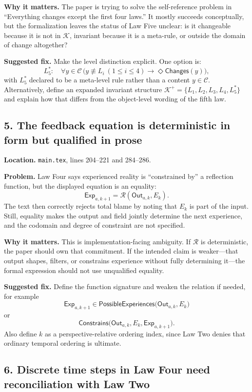 \documentclass[11pt]{article}
\newcommand{\Out}{\mathsf{Out}}
\newcommand{\Exp}{\mathsf{Exp}}
\newcommand{\Reflect}{\mathcal{R}}
\newcommand{\Kernel}{\mathcal{K}}
\begin{document}
\textbf{Why it matters.} The paper is trying to solve the self-reference problem in ``Everything changes except the first four laws.'' It mostly succeeds conceptually, but the formalization leaves the status of Law Five unclear: is it changeable because it is not in $\Kernel$, invariant because it is a meta-rule, or outside the domain of change altogether?

\textbf{Suggested fix.} Make the level distinction explicit. One option is:
\[
L_5^\ast:\quad \forall y\in\mathcal{C}\,\bigl(y\not\equiv L_i\ (1\leq i\leq4)\rightarrow\Diamond\mathsf{Changes}(y)\bigr),
\]
with $L_5^\ast$ declared to be a meta-level rule rather than a content $y\in\mathcal{C}$. Alternatively, define an expanded invariant structure $\Kernel^+=\{L_1,L_2,L_3,L_4,L_5^\ast\}$ and explain how that differs from the object-level wording of the fifth law.

\subsection*{5. The feedback equation is deterministic in form but qualified in prose}

\textbf{Location.} \texttt{main.tex}, lines 204--221 and 284--286.

\textbf{Problem.} Law Four says experienced reality is ``constrained by'' a reflection function, but the displayed equation is an equality:
\[
\Exp_{a,k+1}=\Reflect(\Out_{a,k},E_k).
\]
The text then correctly rejects total blame by noting that $E_k$ is part of the input. Still, equality makes the output and field jointly determine the next experience, and the codomain and degree of constraint are not specified.

\textbf{Why it matters.} This is implementation-facing ambiguity. If $\Reflect$ is deterministic, the paper should own that commitment. If the intended claim is weaker---that output shapes, filters, or constrains experience without fully determining it---the formal expression should not use unqualified equality.

\textbf{Suggested fix.} Define the function signature and weaken the relation if needed, for example
\[
\Exp_{a,k+1}\in\mathsf{PossibleExperiences}\bigl(\Out_{a,k},E_k\bigr)
\]
or
\[
\mathsf{Constrains}\bigl(\Out_{a,k},E_k,\Exp_{a,k+1}\bigr).
\]
Also define $k$ as a perspective-relative ordering index, since Law Two denies that ordinary temporal ordering is ultimate.

\subsection*{6. Discrete time steps in Law Four need reconciliation with Law Two}
\end{document}
